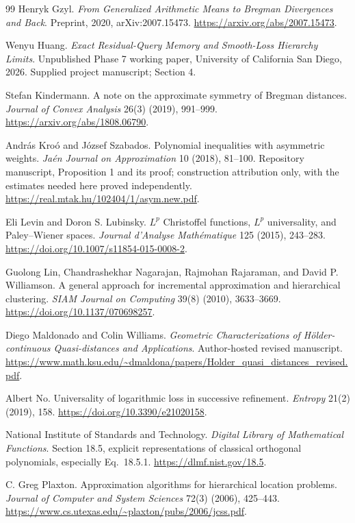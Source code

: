 \documentclass[11pt]{article}
\theoremstyle{definition}\newtheorem{definition}[theorem]{Definition}
\theoremstyle{remark}\newtheorem{remark}[theorem]{Remark}
\begin{document}
\begin{thebibliography}{99}
Henryk Gzyl.
\emph{From Generalized Arithmetic Means to Bregman Divergences and Back}.
Preprint, 2020, arXiv:2007.15473.
\url{https://arxiv.org/abs/2007.15473}.

Wenyu Huang.
\emph{Exact Residual-Query Memory and Smooth-Loss Hierarchy Limits}.
Unpublished Phase 7 working paper, University of California San Diego, 2026.
Supplied project manuscript; Section 4.

Stefan Kindermann.
A note on the approximate symmetry of Bregman distances.
\emph{Journal of Convex Analysis} 26(3) (2019), 991--999.
\url{https://arxiv.org/abs/1808.06790}.

Andr\'as Kro\'o and J\'ozsef Szabados.
Polynomial inequalities with asymmetric weights.
\emph{Ja\'en Journal on Approximation} 10 (2018), 81--100.
Repository manuscript, Proposition 1 and its proof; construction attribution only, with the estimates needed here proved independently.
\url{https://real.mtak.hu/102404/1/asym.new.pdf}.

Eli Levin and Doron S. Lubinsky.
$L^p$ Christoffel functions, $L^p$ universality, and Paley--Wiener spaces.
\emph{Journal d'Analyse Math\'ematique} 125 (2015), 243--283.
\url{https://doi.org/10.1007/s11854-015-0008-2}.

Guolong Lin, Chandrashekhar Nagarajan, Rajmohan Rajaraman, and David P. Williamson.
A general approach for incremental approximation and hierarchical clustering.
\emph{SIAM Journal on Computing} 39(8) (2010), 3633--3669.
\url{https://doi.org/10.1137/070698257}.

Diego Maldonado and Colin Williams.
\emph{Geometric Characterizations of H\"older-continuous Quasi-distances and Applications}.
Author-hosted revised manuscript.
\url{https://www.math.ksu.edu/~dmaldona/papers/Holder_quasi_distances_revised.pdf}.

Albert No.
Universality of logarithmic loss in successive refinement.
\emph{Entropy} 21(2) (2019), 158.
\url{https://doi.org/10.3390/e21020158}.

National Institute of Standards and Technology.
\emph{Digital Library of Mathematical Functions}.
Section 18.5, explicit representations of classical orthogonal polynomials, especially Eq.~18.5.1.
\url{https://dlmf.nist.gov/18.5}.

C. Greg Plaxton.
Approximation algorithms for hierarchical location problems.
\emph{Journal of Computer and System Sciences} 72(3) (2006), 425--443.
\url{https://www.cs.utexas.edu/~plaxton/pubs/2006/jcss.pdf}.


\end{thebibliography}
\end{document}
